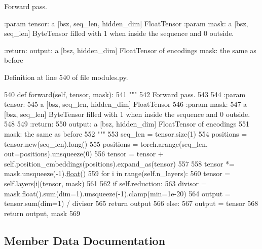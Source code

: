 \begin{DoxyVerb}Forward pass.

:param tensor:
    a [bsz, seq_len, hidden_dim] FloatTensor
:param mask:
    a [bsz, seq_len] ByteTensor filled with 1 when inside the sequence and 0 outside.

:return:
    output: a [bsz, hidden_dim] FloatTensor of encodings
    mask: the same as before
\end{DoxyVerb}
 

Definition at line 540 of file modules.\+py.


\begin{DoxyCode}
540     \textcolor{keyword}{def }forward(self, tensor, mask):
541         \textcolor{stringliteral}{"""}
542 \textcolor{stringliteral}{        Forward pass.}
543 \textcolor{stringliteral}{}
544 \textcolor{stringliteral}{        :param tensor:}
545 \textcolor{stringliteral}{            a [bsz, seq\_len, hidden\_dim] FloatTensor}
546 \textcolor{stringliteral}{        :param mask:}
547 \textcolor{stringliteral}{            a [bsz, seq\_len] ByteTensor filled with 1 when inside the sequence and 0 outside.}
548 \textcolor{stringliteral}{}
549 \textcolor{stringliteral}{        :return:}
550 \textcolor{stringliteral}{            output: a [bsz, hidden\_dim] FloatTensor of encodings}
551 \textcolor{stringliteral}{            mask: the same as before}
552 \textcolor{stringliteral}{        """}
553         seq\_len = tensor.size(1)
554         positions = tensor.new(seq\_len).long()
555         positions = torch.arange(seq\_len, out=positions).unsqueeze(0)
556         tensor = tensor + self.position\_embeddings(positions).expand\_as(tensor)
557 
558         tensor *= mask.unsqueeze(-1).\hyperlink{namespaceprojects_1_1controllable__dialogue_1_1make__control__dataset_aa2b7207688c641dbc094ab44eca27113}{float}()
559         \textcolor{keywordflow}{for} i \textcolor{keywordflow}{in} range(self.n\_layers):
560             tensor = self.layers[i](tensor, mask)
561 
562         \textcolor{keywordflow}{if} self.reduction:
563             divisor = mask.float().sum(dim=1).unsqueeze(-1).clamp(min=1e-20)
564             output = tensor.sum(dim=1) / divisor
565             \textcolor{keywordflow}{return} output
566         \textcolor{keywordflow}{else}:
567             output = tensor
568             \textcolor{keywordflow}{return} output, mask
569 \end{DoxyCode}


\subsection{Member Data Documentation}
\mbox{\label{classprojects_1_1image__chat_1_1transresnet__multimodal_1_1modules_1_1MultimodalCombiner_aca0caa4e6262ec061a318348d99e517b}} 
